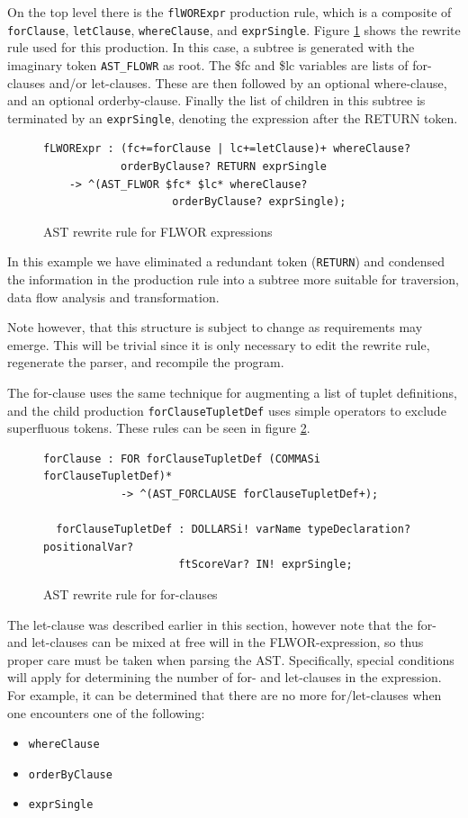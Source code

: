 On the top level there is the \verb!flWORExpr! production rule, which is a
composite of \verb!forClause!, \verb!letClause!, \verb!whereClause!, and
\verb!exprSingle!. Figure \ref{code:ast:flwor} shows the rewrite rule used for
this production. In this case, a subtree is generated with the imaginary token
\verb!AST_FLOWR! as root. The \$fc and \$lc variables are lists of
for-clauses and/or let-clauses. These are then followed by an optional
where-clause, and an optional orderby-clause. Finally the list of children in
this subtree is terminated by an \verb!exprSingle!, denoting the expression
after the RETURN token.

\begin{figure}[h!]
\begin{Verbatim}
fLWORExpr : (fc+=forClause | lc+=letClause)+ whereClause?
            orderByClause? RETURN exprSingle
    -> ^(AST_FLWOR $fc* $lc* whereClause?
                    orderByClause? exprSingle);
\end{Verbatim}
\caption{AST rewrite rule for FLWOR expressions}
\label{code:ast:flwor}
\end{figure}

In this example we have eliminated a redundant token (\verb!RETURN!) and
condensed the information in the production rule into a subtree more suitable
for traversion, data flow analysis and transformation.

Note however, that this structure is subject to change as requirements may 
emerge. This will be trivial since it is only necessary to edit the rewrite
rule, regenerate the parser, and recompile the program.

The for-clause uses the same technique for augmenting a list of tuplet
definitions, and the child production \verb!forClauseTupletDef! uses simple
operators to exclude superfluous tokens. These rules can be seen in figure
\ref{code:ast:forclause}. 

\begin{figure}[h!]
\begin{Verbatim} 
forClause : FOR forClauseTupletDef (COMMASi forClauseTupletDef)* 
            -> ^(AST_FORCLAUSE forClauseTupletDef+);

  forClauseTupletDef : DOLLARSi! varName typeDeclaration? positionalVar? 
                     ftScoreVar? IN! exprSingle;
\end{Verbatim}
\caption{AST rewrite rule for for-clauses}
\label{code:ast:forclause}
\end{figure}

The let-clause was described earlier in this section, however note that the for-
and let-clauses can be mixed at free will in the FLWOR-expression, so thus
proper care must be taken when parsing the AST. Specifically, special conditions
will apply for determining the number of for- and let-clauses in the expression.
For example, it can be determined that there are no more for/let-clauses when
one encounters one of the following:
\begin{itemize}
  \item \verb!whereClause!
  \item \verb!orderByClause!
  \item \verb!exprSingle!
\end{itemize}

